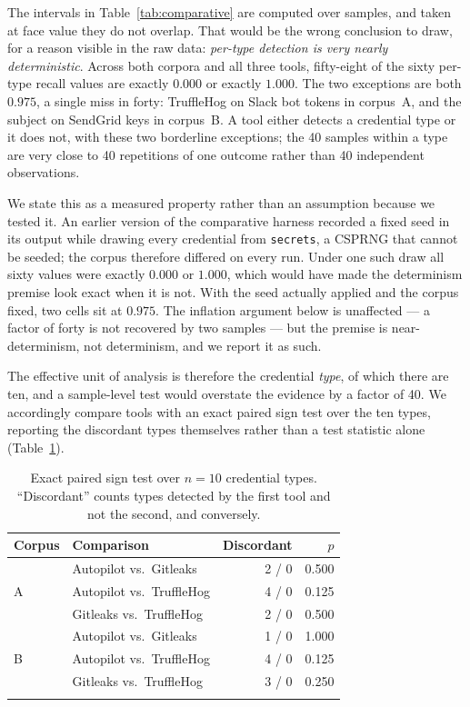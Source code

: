 \documentclass[pdflatex,sn-basic]{sn-jnl}
\begin{document}
The intervals in Table~\ref{tab:comparative} are computed over samples, and taken at face value they do not overlap. That would be the wrong conclusion to draw, for a reason visible in the raw data: \emph{per-type detection is very nearly deterministic}. Across both corpora and all three tools, fifty-eight of the sixty per-type recall values are exactly $0.000$ or exactly $1.000$. The two exceptions are both $0.975$, a single miss in forty: TruffleHog on Slack bot tokens in corpus~A, and the subject on SendGrid keys in corpus~B. A tool either detects a credential type or it does not, with these two borderline exceptions; the 40 samples within a type are very close to 40 repetitions of one outcome rather than 40 independent observations.

We state this as a measured property rather than an assumption because we tested it. An earlier version of the comparative harness recorded a fixed seed in its output while drawing every credential from \texttt{secrets}, a CSPRNG that cannot be seeded; the corpus therefore differed on every run. Under one such draw all sixty values were exactly $0.000$ or $1.000$, which would have made the determinism premise look exact when it is not. With the seed actually applied and the corpus fixed, two cells sit at $0.975$. The inflation argument below is unaffected --- a factor of forty is not recovered by two samples --- but the premise is near-determinism, not determinism, and we report it as such.

The effective unit of analysis is therefore the credential \emph{type}, of which there are ten, and a sample-level test would overstate the evidence by a factor of 40. We accordingly compare tools with an exact paired sign test over the ten types, reporting the discordant types themselves rather than a test statistic alone (Table~\ref{tab:paired}).

\begin{table}[t]
\centering
\caption{Exact paired sign test over $n{=}10$ credential types. ``Discordant'' counts types detected by the first tool and not the second, and conversely.}
\label{tab:paired}
\small
\setlength{\tabcolsep}{4pt}
\begin{tabular}{@{}llrr@{}}
\toprule
Corpus & Comparison & Discordant & $p$ \\
\midrule
\multirow{3}{*}{A}
 & Autopilot vs.\ Gitleaks & 2 / 0 & 0.500 \\
 & Autopilot vs.\ TruffleHog & 4 / 0 & 0.125 \\
 & Gitleaks vs.\ TruffleHog & 2 / 0 & 0.500 \\
\midrule
\multirow{3}{*}{B}
 & Autopilot vs.\ Gitleaks & 1 / 0 & 1.000 \\
 & Autopilot vs.\ TruffleHog & 4 / 0 & 0.125 \\
 & Gitleaks vs.\ TruffleHog & 3 / 0 & 0.250 \\
\botrule
\end{tabular}
\end{table}
\end{document}
